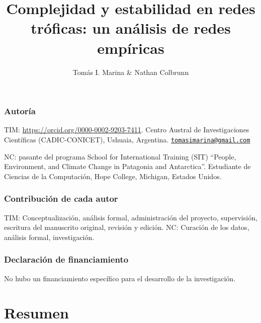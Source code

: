 \documentclass[
]{article}
\title{Complejidad y estabilidad en redes tróficas: un análisis de redes
empíricas}
\author{Tomás I. Marina \& Nathan Colbrunn}
\date{}
\begin{document}
\maketitle

\hypertarget{autoruxeda}{%
\subsubsection{Autoría}\label{autoruxeda}}

TIM: \url{https://orcid.org/0000-0002-9203-7411}. Centro Austral de
Investigaciones Científicas (CADIC-CONICET), Ushuaia, Argentina.
\href{mailto:tomasimarina@gmail.com}{\nolinkurl{tomasimarina@gmail.com}}

NC: pasante del programa School for International Training (SIT)
``People, Environment, and Climate Change in Patagonia and Antarctica''.
Estudiante de Ciencias de la Computación, Hope College, Michigan,
Estados Unidos.

\hypertarget{contribuciuxf3n-de-cada-autor}{%
\subsubsection{Contribución de cada
autor}\label{contribuciuxf3n-de-cada-autor}}

TIM: Conceptualización, análisis formal, administración del proyecto,
supervisión, escritura del manuscrito original, revisión y edición. NC:
Curación de los datos, análisis formal, investigación.

\hypertarget{declaraciuxf3n-de-financiamiento}{%
\subsubsection{Declaración de
financiamiento}\label{declaraciuxf3n-de-financiamiento}}

No hubo un financiamiento específico para el desarrollo de la
investigación.

\hypertarget{resumen}{%
\section{Resumen}\label{resumen}}
\end{document}

